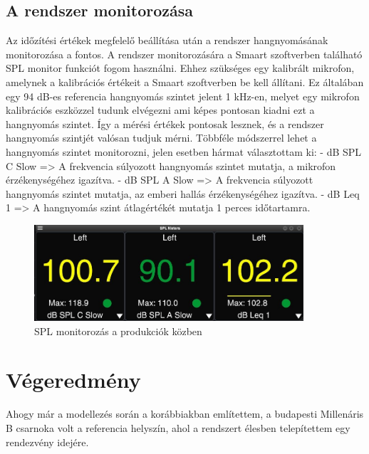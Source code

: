 \subsection{A rendszer monitorozása}
Az időzítési értékek megfelelő beállítása után a rendszer hangnyomásának monitorozása a fontos.
A rendszer monitorozására a Smaart szoftverben található SPL monitor funkciót fogom használni.
Ehhez szükséges egy kalibrált mikrofon, amelynek a kalibrációs értékeit a Smaart szoftverben be kell állítani. 
Ez általában egy 94 dB-es referencia hangnyomás szintet jelent 1 kHz-en, melyet egy mikrofon kalibrációs eszközzel tudunk elvégezni ami képes pontosan kiadni ezt a hangnyomás szintet.
Így a mérési értékek pontosak lesznek, és a rendszer hangnyomás szintjét valósan tudjuk mérni.
Többféle módszerrel lehet a hangnyomás szintet monitorozni, jelen esetben hármat választottam ki:
- dB SPL C Slow => A frekvencia súlyozott hangnyomás szintet mutatja, a mikrofon érzékenységéhez igazítva.
- dB SPL A Slow => A frekvencia súlyozott hangnyomás szintet mutatja, az emberi hallás érzékenységéhez igazítva.
- dB Leq 1 => A hangnyomás szint átlagértékét mutatja 1 perces időtartamra.
\begin{figure}[H]
	\centering
	\includegraphics[width=100mm, keepaspectratio]{figures/smaart_spl_meter.jpg}
	\caption{SPL monitorozás a produkciók közben}\label{fig:smaart_spl_meter}
\end{figure}


\section{Végeredmény} %
Ahogy már a modellezés során a korábbiakban említettem, a budapesti Millenáris B csarnoka volt a referencia helyszín, ahol a rendszert élesben telepítettem egy rendezvény idejére.



